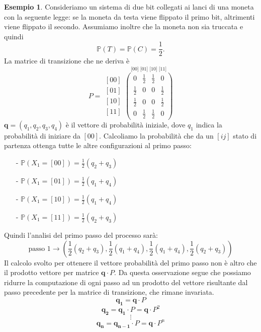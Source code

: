 \documentclass{article}
\theoremstyle{definition}
\newtheorem{example}[theorem]{Esempio}
\theoremstyle{remark}
\begin{document}
\begin{example}
    Consideriamo un sistema di due bit collegati ai lanci di una moneta con la seguente legge:
    se la moneta da testa viene flippato il primo bit, altrimenti viene flippato il secondo. Assumiamo
    inoltre che la moneta non sia truccata e quindi
    $$\mathbb{P}(T)= \mathbb{P}(C) = \frac{1}{2}.$$
    La matrice di transizione che ne deriva è
    $$P = \begin{matrix}
            [00] \\
            [01] \\
            [10] \\
            [11]
        \end{matrix}\overset{\text{[00] [01] [10] [11]}}
        {\begin{pmatrix}
                0           & \frac{1}{2} & \frac{1}{2} & 0           \\
                \frac{1}{2} & 0           & 0           & \frac{1}{2} \\
                \frac{1}{2} & 0           & 0           & \frac{1}{2} \\
                0           & \frac{1}{2} & \frac{1}{2} & 0
            \end{pmatrix}}$$
    $\boldsymbol{q}=(q_1,q_2,q_3,q_4)$ è il vettore di probabilità iniziale, dove $q_1$ indica la probabilità di iniziare da $[00]$.
    Calcoliamo la probabilità che da un $[ij]$ stato di partenza ottenga tutte le altre configurazioni al primo passo:
    \begin{itemize}
        \item [-]$\mathbb{P}(X_1=[00]) = \frac{1}{2}(q_2+q_3)$
        \item [-]$\mathbb{P}(X_1=[01]) = \frac{1}{2}(q_1+q_4)$
        \item [-]$\mathbb{P}(X_1=[10]) = \frac{1}{2}(q_1+q_4)$
        \item [-]$\mathbb{P}(X_1=[11]) = \frac{1}{2}(q_2+q_3)$
    \end{itemize}
    Quindi l'analisi del primo passo del processo sarà:
    $$\text{passo 1} \to(\frac{1}{2}(q_2+q_3),\frac{1}{2}(q_1+q_4),\frac{1}{2}(q_1+q_4),\frac{1}{2}(q_2+q_3))$$
    Il calcolo svolto per ottenere il vettore probabilità del primo passo non è altro che il prodotto vettore per matrice
    $\boldsymbol{q} \cdot P$. Da questa osservazione segue che possiamo ridurre la computazione di ogni passo ad un prodotto del vettore
    risultante dal passo precedente per la matrice di transizione, che rimane invariata.
    $$\boldsymbol{q_1} = \boldsymbol{q}\cdot P$$
    $$\boldsymbol{q_2} =\boldsymbol{q_1}\cdot P= \boldsymbol{q}\cdot P^2$$
    $$\vdots$$
    $$\boldsymbol{q_n} = \boldsymbol{q_{n-1}}\cdot P = \boldsymbol{q}\cdot P^n$$
\end{example}
\end{document}
